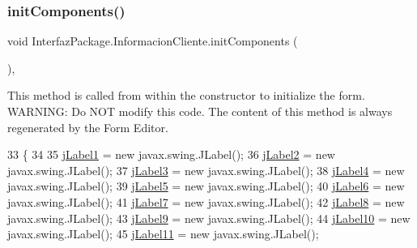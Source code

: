 \subsubsection{\texorpdfstring{init\+Components()}{initComponents()}}
{\footnotesize\ttfamily void Interfaz\+Package.\+Informacion\+Cliente.\+init\+Components (\begin{DoxyParamCaption}{ }\end{DoxyParamCaption})\hspace{0.3cm}{\ttfamily [inline]}, {\ttfamily [private]}}

This method is called from within the constructor to initialize the form. W\+A\+R\+N\+I\+NG\+: Do N\+OT modify this code. The content of this method is always regenerated by the Form Editor. 
\begin{DoxyCode}
33                                   \{
34 
35         \mbox{\hyperlink{class_interfaz_package_1_1_informacion_cliente_a76d63040cd29ebdaf61bb51a1f748393}{jLabel1}} = \textcolor{keyword}{new} javax.swing.JLabel();
36         \mbox{\hyperlink{class_interfaz_package_1_1_informacion_cliente_a1ff1b1422342b4b51d17fb166ec625ff}{jLabel2}} = \textcolor{keyword}{new} javax.swing.JLabel();
37         \mbox{\hyperlink{class_interfaz_package_1_1_informacion_cliente_affc4d391ce9a4a138bb4ea1fc2fc23ec}{jLabel3}} = \textcolor{keyword}{new} javax.swing.JLabel();
38         \mbox{\hyperlink{class_interfaz_package_1_1_informacion_cliente_aa0124c463f35b5a5caaf6987b4329799}{jLabel4}} = \textcolor{keyword}{new} javax.swing.JLabel();
39         \mbox{\hyperlink{class_interfaz_package_1_1_informacion_cliente_a12ceb5a1b4c467dfa98d98325d8ef848}{jLabel5}} = \textcolor{keyword}{new} javax.swing.JLabel();
40         \mbox{\hyperlink{class_interfaz_package_1_1_informacion_cliente_a821aa89fbcb7dfaebf2fadaa9afe79e6}{jLabel6}} = \textcolor{keyword}{new} javax.swing.JLabel();
41         \mbox{\hyperlink{class_interfaz_package_1_1_informacion_cliente_a43ed96cf07f28a71b91c6825e13023c3}{jLabel7}} = \textcolor{keyword}{new} javax.swing.JLabel();
42         \mbox{\hyperlink{class_interfaz_package_1_1_informacion_cliente_acafa312ca1d5f92c4d3f969e1879289b}{jLabel8}} = \textcolor{keyword}{new} javax.swing.JLabel();
43         \mbox{\hyperlink{class_interfaz_package_1_1_informacion_cliente_a03808e144608db738a13ec9eaa6d5559}{jLabel9}} = \textcolor{keyword}{new} javax.swing.JLabel();
44         \mbox{\hyperlink{class_interfaz_package_1_1_informacion_cliente_af5593b23fec083a2c1f0cfccfb17b2ad}{jLabel10}} = \textcolor{keyword}{new} javax.swing.JLabel();
45         \mbox{\hyperlink{class_interfaz_package_1_1_informacion_cliente_a31fbf3562a8a9f5df8d2b5b19f2f9f76}{jLabel11}} = \textcolor{keyword}{new} javax.swing.JLabel();

\end{DoxyCode}
